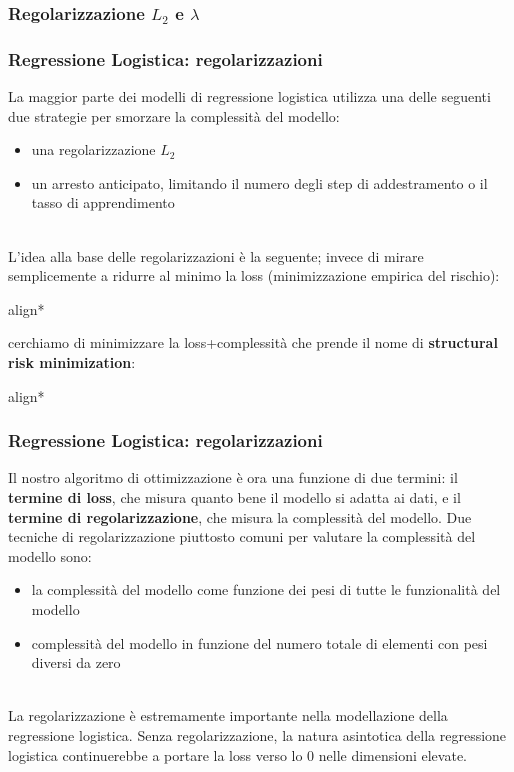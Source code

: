 \subsubsection[Regolarizzazioni $L_2$ e $\lambda$]{Regolarizzazione $L_2$ e $\lambda$}

\begin{frame}
	
	\frametitle{Regressione Logistica: regolarizzazioni}

	La maggior parte dei modelli di regressione logistica utilizza una delle seguenti due strategie per smorzare la complessità del modello:
	\begin{itemize}
		\item una regolarizzazione $L_2$
		\item un arresto anticipato, limitando il numero degli step di addestramento o il tasso di apprendimento
	\end{itemize}
	\ \\
	L'idea alla base delle regolarizzazioni è la seguente;
	invece di mirare semplicemente a ridurre al minimo la loss (minimizzazione empirica del rischio):
	\begin{empheq}[box=\fcolorbox{blue!40!black!60}{yellow!10}]{align*}
	\end{empheq}
	cerchiamo di minimizzare la loss+complessità che prende il nome di \textbf{structural risk minimization}:
	\begin{empheq}[box=\fcolorbox{blue!40!black!60}{yellow!10}]{align*}
	\end{empheq}
\end{frame}


\begin{frame}
	
	\frametitle{Regressione Logistica: regolarizzazioni}

	Il nostro algoritmo di ottimizzazione è ora una funzione di due termini: il \textbf{termine di loss}, che misura quanto bene il modello si adatta ai dati, e il \textbf{termine di regolarizzazione}, che misura la complessità del modello.
	\newlinedouble
	Due tecniche di regolarizzazione piuttosto comuni per valutare la complessità del modello sono:
	\begin{itemize}
		\item la complessità del modello come funzione dei pesi di tutte le funzionalità del modello
		\item complessità del modello in funzione del numero totale di elementi con pesi diversi da zero
	\end{itemize}
	
	\ \\
	La regolarizzazione è estremamente importante nella modellazione della regressione logistica. Senza regolarizzazione, la natura asintotica della regressione logistica continuerebbe a portare la loss verso lo 0 nelle dimensioni elevate.

\end{frame}


